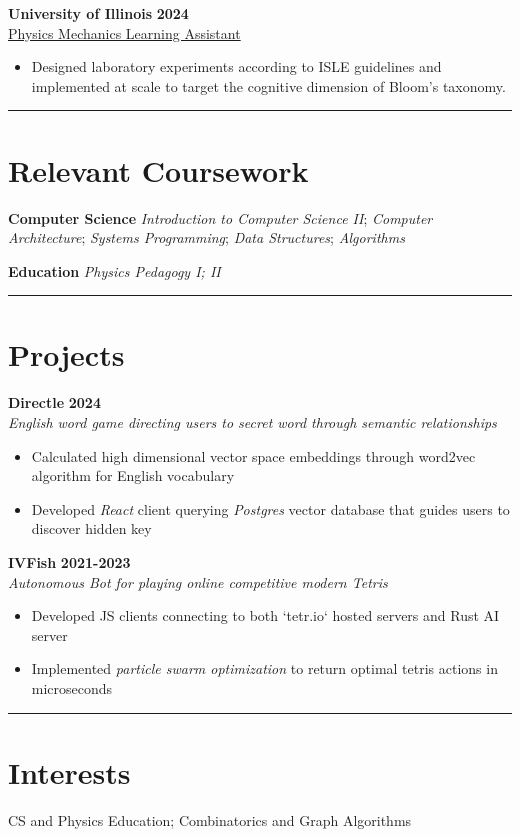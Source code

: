 \documentclass[11pt]{article}
\begin{document}
\textbf{University of Illinois} \hfill \textbf{2024} \\
\underline{Physics Mechanics Learning Assistant}
\begin{itemize}
	\cramped
	\item Designed laboratory experiments according to ISLE guidelines and implemented at scale to target the cognitive dimension of Bloom's taxonomy.
\end{itemize}

\rule{\textwidth}{0.1pt}
\vspace*{-10mm}

\section*{Relevant Coursework}
\textbf{Computer Science}
\emph{Introduction to Computer Science II};
\emph{Computer Architecture};
\emph{Systems Programming};
\emph{Data Structures};
\emph{Algorithms}

\textbf{Education}
\emph{Physics Pedagogy I; II}

\rule{\textwidth}{0.1pt}
\vspace*{-10mm}

\section*{Projects}

\textbf{Directle} \hfill \textbf{2024} \\
\emph{English word game directing users to secret word through semantic relationships}
\begin{itemize}
	\cramped
    \item Calculated high dimensional vector space embeddings through word2vec algorithm for English vocabulary
    \item Developed \emph{React} client querying \emph{Postgres} vector database that guides users to discover hidden key
\end{itemize}

\textbf{IVFish} \hfill \textbf{2021-2023} \\
\emph{Autonomous Bot for playing online competitive modern Tetris}
\begin{itemize}
	\cramped
	\item Developed JS clients connecting to both `tetr.io` hosted servers and Rust AI server
    \item Implemented \emph{particle swarm optimization} to return optimal tetris actions in microseconds
\end{itemize}

\rule{\textwidth}{0.1pt}
\vspace*{-10mm}

\section*{Interests}
CS and Physics Education;
Combinatorics and Graph Algorithms
\end{document}
